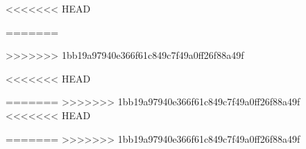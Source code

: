 \documentclass[conference]{IEEEtran}
\begin{document}
% 

\ifCLASSOPTIONcaptionsoff
  \newpage
\fi



% 
% 


<<<<<<< HEAD
% 

=======
% 

>>>>>>> 1bb19a97940e366f61c849c7f49a0ff26f88a49f


<<<<<<< HEAD

=======
%
>>>>>>> 1bb19a97940e366f61c849c7f49a0ff26f88a49f
%
%
<<<<<<< HEAD
%

=======
>>>>>>> 1bb19a97940e366f61c849c7f49a0ff26f88a49f
\end{document}
